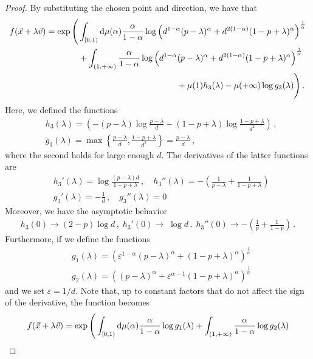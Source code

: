 \documentclass[aps,pra,11pt,onecolumn,nofootinbib,tightenlines]{revtex4-2}
\theoremstyle{definition}
\def \d {\mathrm{d}}
\begin{document}
\begin{proof}
By substituting the chosen point and direction, we have that
\begin{align}
    f(\vec{x}+\lambda\vec{v}) = \exp\Bigg(&\int_{[0,1)}\d \mu(\alpha)\frac{\alpha}{1-\alpha}\log{\left(d^{1-\alpha}(p-\lambda)^\alpha+d^{2(1-\alpha)}(1-p+\lambda)^\alpha\right)^\frac{1}{\alpha}} \notag \\
&+\int_{(1,+\infty)}\frac{\alpha}{1-\alpha}\log{\left(d^{1-\alpha}(p-\lambda)^\alpha+d^{2(1-\alpha)}(1-p+\lambda)^\alpha\right)^\frac{1}{\alpha}} \notag \\
    &\qquad\quad\qquad \qquad \;\; \qquad \qquad +\mu(1) h_3(\lambda) - \mu( +\infty) \log g_3(\lambda) \Bigg) \,.
\end{align}
Here, we defined the functions
\begin{align}
    &h_3(\lambda) = \left(-(p-\lambda) \log{\frac{p-\lambda}{d}}-(1-p+\lambda)\log{\frac{1-p+\lambda}{d^2}} \right) \,, \\
    & g_3(\lambda) = \max \left\{\frac{p-\lambda}{d},\frac{1-p+\lambda}{d^2}\right\} = \frac{p-\lambda}{d} \,,
\end{align}
where the second holds for large enough $d$.
The derivatives of the latter functions are
\begin{align}
    &h_3'(\lambda) =  \log{\frac{(p-\lambda)d}{1-p+\lambda}} \,, \quad h_3''(\lambda) = -\left(\frac{1}{p-\lambda}+\frac{1}{1-p+\lambda}\right)  \\
    &g_3'(\lambda) = -\frac{1}{d}\,, \quad g_3''(\lambda) =0
\end{align}
Moreover, we have the asymptotic behavior
\begin{align}
    h_3(0) \rightarrow (2-p) \log{d}\,, \; h_3'(0) \rightarrow  \;\log{d} \,, \; h_3''(0) \rightarrow -\left(\frac{1}{p}+\frac{1}{1-p}\right)  \,.
\end{align}
Furthermore, if we define the functions
\begin{align}
&g_1(\lambda)=\left(\varepsilon^{1-\alpha}(p-\lambda)^\alpha+(1-p+\lambda)^\alpha\right)^\frac{1}{\alpha}\\
    & g_2(\lambda)=\left((p-\lambda)^\alpha+\varepsilon^{\alpha-1}(1-p+\lambda)^\alpha\right)^\frac{1}{\alpha}
\end{align}
and we set $\varepsilon =1/d$. Note that, up to constant factors that do not affect the sign of the derivative, the function becomes
\begin{align}
    f(\vec{x}+\lambda\vec{v}) = \exp\Bigg(&\int_{[0,1)}\d \mu(\alpha)\frac{\alpha}{1-\alpha}\log{g_1(\lambda)} +\int_{(1,+\infty)}\frac{\alpha}{1-\alpha}\log{g_2(\lambda)} \notag \\

\end{align}
\end{proof}
\end{document}
